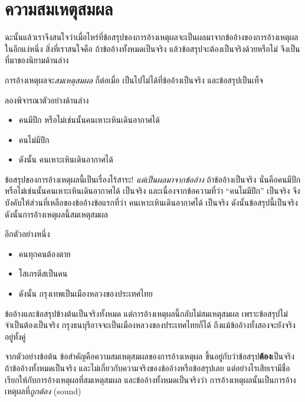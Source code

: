 \documentclass[a4paper,12pt]{extbook}
\theoremstyle{definition}
\theoremstyle{remark}
\newcommand{\boxthis}[1]{
	\begin{textbox}%
		#1 
	\end{textbox}%
}
\begin{document}
		\section{ความสมเหตุสมผล}
			ฉะนั้นแล้วเราจึงสนใจว่าเมื่อไหร่ที่ข้อสรุปของการอ้างเหตุผลจะเป็นผลมาจากข้ออ้างของการอ้างเหตุผล ในอีกแง่หนึ่ง สิ่งที่เราสนใจคือ ถ้าข้ออ้างทั้งหมดเป็นจริง แล้วข้อสรุปจะต้องเป็นจริงด้วยหรือไม่ จึงเป็นที่มาของนิยามด้านล่าง
			\boxthis{การอ้างเหตุผลจะ\textit{สมเหตุสมผล} ก็ต่อเมื่อ เป็นไปไม่ได้ที่ข้ออ้างเป็นจริง และข้อสรุปเป็นเท็จ}
			ลองพิจารณาตัวอย่างด้านล่าง
			\begin{itemize}
				\item[] คนมีปีก หรือไม่เช่นนั้นคนเหาะเหินเดินอากาศได้
				\item[]	คนไม่มีปีก
				\item[] ดังนั้น คนเหาะเหินเดินอากาศได้
			\end{itemize}
			ข้อสรุปของการอ้างเหตุผลนี้เป็นเรื่องไร้สาระ! \textit{แต่เป็นผลมาจากข้ออ้าง} ถ้าข้ออ้างเป็นจริง นั่นคือคนมีปีก หรือไม่เช่นนั้นคนเหาะเหินเดินอากาศได้ เป็นจริง และเนื่องจากข้อความที่ว่า ``คนไมมีปีก'' เป็นจริง จึงบังคับให้ส่วนที่เหลือของข้ออ้างข้อแรกที่ว่า คนเหาะเหินเดินอากาศได้ เป็นจริง ดังนั้นข้อสรุปนี้เป็นจริง ดังนั้นการอ้างเหตุผลนี้สมเหตุสมผล
			
			อีกตัวอย่างหนึ่ง
			\begin{itemize}
				\item[] คนทุกคนต้องตาย
				\item[]	โสเกรตีสเป็นคน
				\item[] ดังนั้น กรุงเทพเป็นเมืองหลวงของประเทศไทย
			\end{itemize}
			ข้ออ้างและข้อสรุปข้างต้นเป็นจริงทั้งหมด แต่การอ้างเหตุผลนี้กลับไม่สมเหตุสมผล เพราะข้อสรุปไม่จำเป็นต้องเป็นจริง กรุงธนบุรีอาจจะเป็นเมืองหลวงของประเทศไทยก็ได้ ถึงแม้ข้ออ้างทั้งสองจะยังจริงอยู่ทั้งคู่
			
			จากตัวอย่างข้อต้น ข้อสำคัญคือความสมเหตุสมผลของการอ้างเหตุผล ขึ้นอยู่กับว่าข้อสรุป\textbf{ต้อง}เป็นจริง ถ้าข้ออ้างทั้งหมดเป็นจริง และไม่เกี่ยวกับความจริงของข้ออ้างหรือข้อสรุปเลย แต่อย่างไรเสียเรามีชื่อเรียกให้กับการอ้างเหตุผลที่สมเหตุสมผล และข้ออ้างทั้งหมดเป็นจริงว่า การอ้างเหตุผลนั้นเป็นการอ้างเหตุผลที่\textit{ถูกต้อง} (sound)
			
\end{document}
